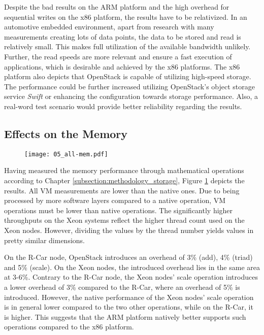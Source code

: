             \noindent Despite the bad results on the ARM platform and the high overhead for sequential writes on the x86 platform, the results have to be relativized.
            In an automotive embedded environment, apart from research with many measurements creating lots of data points, the data to be stored and read is relatively small.
            This makes full utilization of the available bandwidth unlikely.
            Further, the read speeds are more relevant and ensure a fast execution of applications, which is desirable and achieved by the x86 platforms.
            The x86 platform also depicts that OpenStack is capable of utilizing high-speed storage.
            The performance could be further increased utilizing OpenStack's object storage service \textsl{Swift} or enhancing the configuration towards storage performance.
            Also, a real-word test scenario would provide better reliability regarding the results.

           
        \subsection{Effects on the Memory}
        \label{subsection:memory_impact}
            
            \begin{figure}[ht]
              \centering
              \texttt{[image: 05\_all-mem.pdf]}
              \label{fig:all_mem}
            \end{figure}
            
            \noindent Having measured the memory performance through mathematical operations according to Chapter \ref{subsection:methodology_storage}, Figure \ref{fig:all_mem} depicts the results.
            All \ac{VM} measurements are lower than the native ones.
            Due to being processed by more software layers compared to a native operation, \ac{VM} operations must be lower than native operations.
            The significantly higher throughputs on the Xeon systems reflect the higher thread count used on the Xeon nodes.
            However, dividing the values by the thread number yields values in pretty similar dimensions.
            
            \noindent On the R-Car node, OpenStack introduces an overhead of 3\% (add), 4\% (triad) and 5\% (scale).
            On the Xeon nodes, the introduced overhead lies in the same area at 3-6\%.
            Contrary to the R-Car node, the Xeon nodes' scale operation introduces a lower overhead of 3\% compared to the R-Car, where an overhead of 5\% is introduced.
            However, the native performance of the Xeon nodes' scale operation is in general lower compared to the two other operations, while on the R-Car, it is higher.
            This suggests that the ARM platform natively better supports such operations compared to the x86 platform.
            
